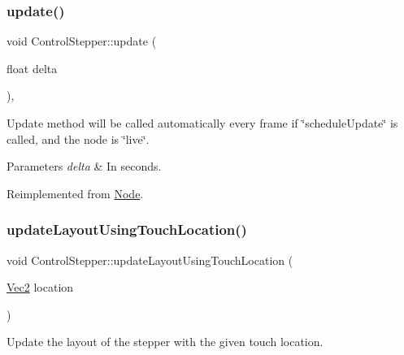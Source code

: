 \subsubsection{\texorpdfstring{update()}{update()}\hspace{0.1cm}{\footnotesize\ttfamily [2/2]}}
{\footnotesize\ttfamily void Control\+Stepper\+::update (\begin{DoxyParamCaption}\item[{float}]{delta }\end{DoxyParamCaption})\hspace{0.3cm}{\ttfamily [override]}, {\ttfamily [virtual]}}

Update method will be called automatically every frame if \char`\"{}schedule\+Update\char`\"{} is called, and the node is \char`\"{}live\char`\"{}. 
\begin{DoxyParams}{Parameters}
{\em delta} & In seconds. \\
\hline
\end{DoxyParams}


Reimplemented from \hyperlink{classNode_a32878481ba54b3856ab53c10af13848e}{Node}.

\mbox{\label{classControlStepper_adf8058658ff4555b71ace43f54f60a56}} 
\subsubsection{\texorpdfstring{update\+Layout\+Using\+Touch\+Location()}{updateLayoutUsingTouchLocation()}\hspace{0.1cm}{\footnotesize\ttfamily [1/2]}}
{\footnotesize\ttfamily void Control\+Stepper\+::update\+Layout\+Using\+Touch\+Location (\begin{DoxyParamCaption}\item[{\hyperlink{classVec2}{Vec2}}]{location }\end{DoxyParamCaption})}

Update the layout of the stepper with the given touch location. \mbox{\label{classControlStepper_adf8058658ff4555b71ace43f54f60a56}} 

